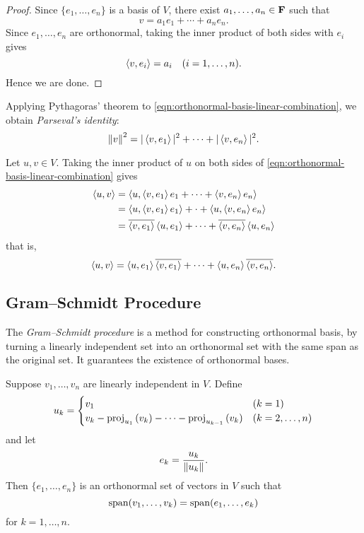 \begin{proof}
Since $\{e_1,\dots,e_n\}$ is a basis of $V$, there exist $a_1,\dots,a_n\in\mathbf F$ such that
\[v=a_1e_1+\cdots+a_ne_n.\]
Since $e_1,\dots,e_n$ are orthonormal, taking the inner product of both sides with $e_i$ gives
\[\left\langle v,e_i\right\rangle=a_i\quad(i=1,\dots,n).\]
Hence we are done.
\end{proof}

Applying Pythagoras' theorem to \cref{eqn:orthonormal-basis-linear-combination}, we obtain \emph{Parseval's identity}:
\begin{equation}\label{eqn:parseval-identity}
\norm{v}^2=|\left\langle v,e_1\right\rangle|^2+\cdots+|\left\langle v,e_n\right\rangle|^2.
\end{equation}

Let $u,v\in V$. Taking the inner product of $u$ on both sides of \cref{eqn:orthonormal-basis-linear-combination} gives
\begin{align*}
\left\langle u,v\right\rangle&=\left\langle u,\left\langle v,e_1\right\rangle e_1+\cdots+\left\langle v,e_n\right\rangle e_n\right\rangle\\
&=\left\langle u,\left\langle v,e_1\right\rangle e_1\right\rangle+\cdot+\left\langle u,\left\langle v,e_n\right\rangle e_n\right\rangle\\
&=\overline{\left\langle v,e_1\right\rangle}\left\langle u,e_1\right\rangle+\cdots+\overline{\left\langle v,e_n\right\rangle}\left\langle u,e_n\right\rangle
\end{align*}
that is,
\begin{equation}
\left\langle u,v\right\rangle=\left\langle u,e_1\right\rangle\overline{\left\langle v,e_1\right\rangle}+\cdots+\left\langle u,e_n\right\rangle\overline{\left\langle v,e_n\right\rangle}.
\end{equation}
\pagebreak

\subsection{Gram--Schmidt Procedure}
The \emph{Gram--Schmidt procedure} is a method for constructing orthonormal basis, by turning a linearly independent set into an orthonormal set with the same span as the original set. It guarantees the existence of orthonormal bases.

\begin{theorem}\label{thrm:gram-schmidt-procedure}
Suppose $v_1,\dots,v_n$ are linearly independent in $V$. Define
\[u_k=\begin{cases}
v_1&(k=1)\\
v_k-\mathrm{proj}_{u_1}\left({v_k}\right)-\cdots-\mathrm{proj}_{u_{k-1}}\left({v_k}\right)&(k=2,\dots,n)
\end{cases}\]
and let
\[e_k=\frac{u_k}{\norm{u_k}}.\]
Then $\{e_1,\dots,e_n\}$ is an orthonormal set of vectors in $V$ such that
\[\operatorname{span}(v_1,\dots,v_k)=\operatorname{span}(e_1,\dots,e_k)\]
for $k=1,\dots,n$.
\end{theorem}

